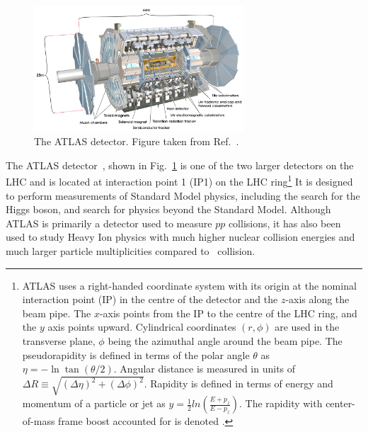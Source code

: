 {











\begin{figure}[ht]
	\centering
	\includegraphics[width=0.7\textwidth]{figures/atlas.pdf} %
	\caption{The ATLAS detector. Figure taken from Ref.~\cite{Aad:2008zzm}.}	
	\label{fig:atlas}%
\end{figure}

The ATLAS detector~\cite{Aad:2008zzm}, shown in Fig.~\ref{fig:atlas} is one of the two larger detectors on the LHC and is located at interaction point 1 (IP1) on the LHC ring\footnote{
	ATLAS uses a right-handed coordinate system with its origin at the nominal interaction point (IP) in the centre of the detector and the $z$-axis along the beam pipe. The $x$-axis points from the IP to the centre of the LHC ring, and the $y$ axis points upward. Cylindrical coordinates $(r,\phi)$ are used in the transverse plane, $\phi$ being the azimuthal angle around the beam pipe. The pseudorapidity is defined in terms of the polar angle $\theta$ as $\eta=-\ln\tan(\theta/2)$. Angular distance is measured in units of $\Delta R \equiv \sqrt{(\Delta\eta)^{2} + (\Delta\phi)^{2}}$. Rapidity is defined in terms of energy and momentum of a particle or jet as $y=\frac{1}{2}ln(\frac{E+p_{z}}{E-p_{z}})$. The rapidity with center-of-mass frame boost accounted for is denoted \ystar.} 
It is designed to perform measurements of Standard Model physics, including the search for the Higgs boson, and search for physics beyond the Standard Model. Although ATLAS is primarily a detector used to measure $pp$ collisions, it has also been used to study Heavy Ion physics with much higher nuclear collision energies and much larger particle multiplicities compared to \pp\ collision.

}
